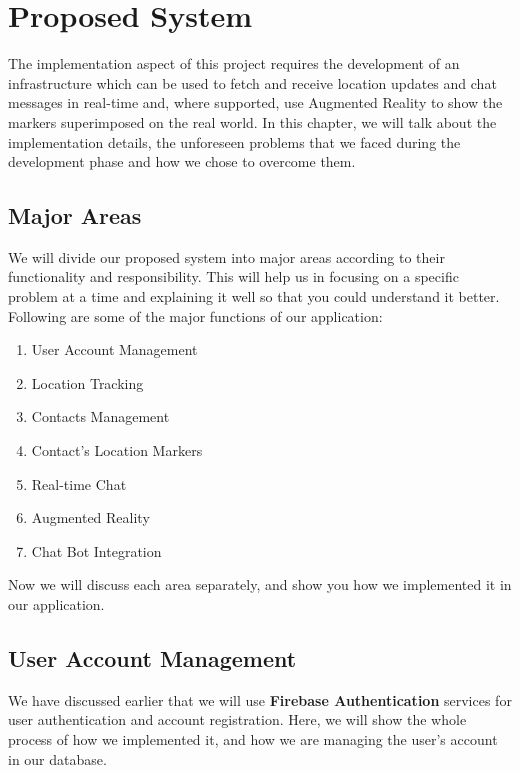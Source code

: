 \chapter{Proposed System} 
\label{chap3}

The implementation aspect of this project requires the development of an infrastructure which can be used to fetch and receive location updates and chat messages in real-time and, where supported, use Augmented Reality to show the markers superimposed on the real world. In this chapter, we will talk about the implementation details, the unforeseen problems that we faced during the development phase and how we chose to overcome them. 

\section{Major Areas}
We will divide our proposed system into major areas according to their functionality and responsibility. This will help us in focusing on a specific problem at a time and explaining it well so that you could understand it better. Following are some of the major functions of our application: 
\begin{enumerate}
    \item User Account Management
    \item Location Tracking
    \item Contacts Management
    \item Contact's Location Markers
    \item Real-time Chat
    \item Augmented Reality
    \item Chat Bot Integration
\end{enumerate}

Now we will discuss each area separately, and show you how we implemented it in our application.

\section{User Account Management}
We have discussed earlier that we will use \textbf{Firebase Authentication} services for user authentication and account registration. Here, we will show the whole process of how we implemented it, and how we are managing the user's account in our database.

